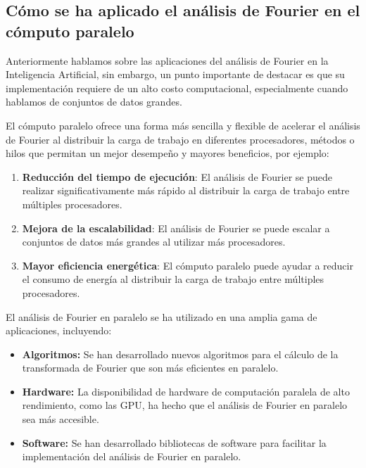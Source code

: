 \subsection{Cómo se ha aplicado el análisis de Fourier en el cómputo paralelo}\label{cuxf3mo-se-ha-aplicado-el-anuxe1lisis-de-fourier-en-el-cuxf3mputo-paralelo}

Anteriormente hablamos sobre las aplicaciones del análisis de Fourier en la Inteligencia Artificial, sin embargo, un punto importante de destacar es que su implementación requiere de un alto costo computacional, especialmente cuando hablamos de conjuntos de datos grandes.

El cómputo paralelo ofrece una forma más sencilla y flexible de acelerar el análisis de Fourier al distribuir la carga de trabajo en diferentes procesadores, métodos o hilos que permitan un mejor desempeño y mayores beneficios, por ejemplo:

\begin{enumerate} \def\labelenumi{\alph{enumi}.} \item   \textbf{Reducción del tiempo de ejecución}: El análisis de Fourier se   puede realizar significativamente más rápido al distribuir la carga de   trabajo entre múltiples procesadores. \item   \textbf{Mejora de la escalabilidad}: El análisis de Fourier se puede   escalar a conjuntos de datos más grandes al utilizar más procesadores. \item   \textbf{Mayor eficiencia energética}: El cómputo paralelo puede ayudar   a reducir el consumo de energía al distribuir la carga de trabajo   entre múltiples procesadores. \end{enumerate}

El análisis de Fourier en paralelo se ha utilizado en una amplia gama de aplicaciones, incluyendo:

\begin{itemize} \item   \textbf{Algoritmos:} Se han desarrollado nuevos algoritmos para el   cálculo de la transformada de Fourier que son más eficientes en   paralelo. \item   \textbf{Hardware:} La disponibilidad de hardware de computación   paralela de alto rendimiento, como las GPU, ha hecho que el análisis   de Fourier en paralelo sea más accesible. \item   \textbf{Software:} Se han desarrollado bibliotecas de software para   facilitar la implementación del análisis de Fourier en paralelo. \end{itemize}

